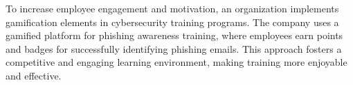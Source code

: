 To increase employee engagement and motivation, an organization implements gamification elements in cybersecurity training programs. The company uses a gamified platform for phishing awareness training, where employees earn points and badges for successfully identifying phishing emails. This approach fosters a competitive and engaging learning environment, making training more enjoyable and effective.